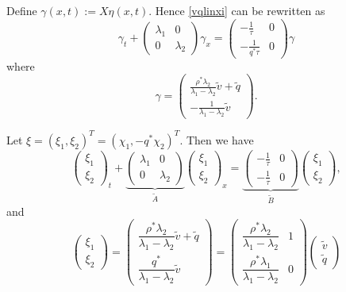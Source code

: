\documentclass[preprint]{elsarticle}
\begin{document}
Define $\gamma(x,t) := X\eta(x,t)$. Hence \eqref{vqlinxi} can be rewritten as
\begin{equation} 
\gamma_t + \begin{pmatrix}
\lambda_1 & 0 \\
0 & \lambda_2
\end{pmatrix} \gamma_x = \begin{pmatrix}
-\frac{1}{\tau} & 0 \\
-\frac{1}{q^* \tau} & 0
\end{pmatrix} \gamma
\end{equation}
where 
\begin{equation}
\gamma = \begin{pmatrix}
\frac{\rho^*\lambda_2}{\lambda_1 - \lambda_2}\tilde{v} + \tilde{q} \\ 
-\frac{1}{\lambda_1 - \lambda_2}\tilde{v} 
\end{pmatrix}. 
\end{equation}

Let $\xi = (\xi_1, \xi_2)^T = (\chi_1, -q^*\chi_2)^T$. Then we have
\begin{equation} \label{vqlindiag}
\begin{pmatrix}
\xi_1 \\ \xi_2
\end{pmatrix}_t + 
\underset{\tilde{A}}{
	\underbrace{
	\begin{pmatrix}
		\lambda_1 & 0 \\
		0 & \lambda_2
	\end{pmatrix} 
	}
}
\begin{pmatrix}
\xi_1 \\ \xi_2
\end{pmatrix}_x = 
\underset{\tilde{B}}{
	\underbrace{
	\begin{pmatrix}
		-\frac{1}{\tau} & 0 \\
		-\frac{1}{\tau} & 0
	\end{pmatrix}}
}
\begin{pmatrix}
\xi_1 \\ \xi_2
\end{pmatrix},
\end{equation}
and
\begin{equation} \label{eq:Riemannzeta}
\begin{pmatrix}
\xi_1 \\ \xi_2
\end{pmatrix} = \begin{pmatrix}
\dfrac{\rho^*\lambda_2}{\lambda_1 - \lambda_2}\tilde{v} + \tilde{q} \\ 
\dfrac{q^*}{\lambda_1 - \lambda_2}\tilde{v} 
\end{pmatrix} = 
\begin{pmatrix}
\dfrac{\rho^*\lambda_2}{\lambda_1-\lambda_2} & 1\\
\dfrac{\rho^*\lambda_1}{\lambda_1-\lambda_2} & 0
\end{pmatrix} \begin{pmatrix}
\tilde{v} \\ \tilde{q} 
\end{pmatrix}
\end{equation}
\end{document}
